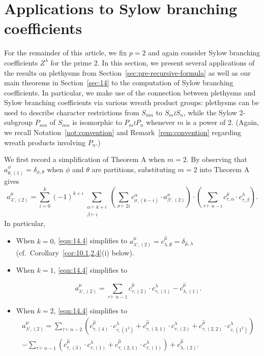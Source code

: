 \documentclass[ALCO, Unicode]{cedram}
\begin{document}
\section{Applications to Sylow branching coefficients}\label{sec:13}
For the remainder of this article, we fix $p=2$ and again consider Sylow branching coefficients $Z^\lambda$ for the prime 2.
In this section, we present several applications of the results on plethysms from Section~\ref{sec:pre-recursive-formula} as well as our main theorems in Section~\ref{sec:14} to the computation of Sylow branching coefficients.
In particular, we make use of the connection between plethysms and Sylow branching coefficients via various wreath product groups: plethysms can be used to describe character restrictions from $S_{mn}$ to $S_m\wr S_n$, while the Sylow 2-subgroup $P_{mn}$ of $S_{mn}$ is isomorphic to $P_m\wr P_n$ whenever $m$ is a power of 2. (Again, we recall Notation~\ref{not:convention} and Remark~\ref{rem:convention} regarding wreath products involving $P_n$.)

We first record a simplification of Theorem A when $m=2$. By observing that $a^\phi_{\theta,(1)}=\delta_{\phi,\theta}$ when $\phi$ and $\theta$ are partitions, substituting $m=2$ into Theorem A gives 
\begin{equation}\label{eqn:14.4}
	a^\mu_{\lambda',(2)} = \sum_{i=0}^k (-1)^{k+i} \sum_{\substack{\alpha\vdash k+i\\\beta\vdash i}} \left(\sum_{\sigma\vdash 2i}c^\alpha_{\sigma,(k-i)}\cdot a^\sigma_{\beta',(2)}\right)\cdot \left(\sum_{\tau\vdash n-i} c^{\hat{\mu}}_{\tau,\alpha}\cdot c^\lambda_{\tau,\beta}\right).
\end{equation}
In particular,
\begin{itemize}
	\item When $k=0$, \eqref{eqn:14.4} simplifies to 
	$a^\mu_{\lambda',(2)} = c^{\hat{\mu}}_{\lambda,\emptyset} = \delta_{\hat{\mu},\lambda}$ (cf.~Corollary~\ref{cor:10.1,2,4}(i) below).
	\item When $k=1$, \eqref{eqn:14.4} simplifies to
	\begin{small}
		\[ a^\mu_{\lambda',(2)} = \sum_{\tau\vdash n-1}c^{\hat{\mu}}_{\tau,(2)}\cdot c^\lambda_{\tau,(1)} - c^{\hat{\mu}}_{\lambda,(1)}. \]
	\end{small}
	\item When $k=2$, \eqref{eqn:14.4} simplifies to
	\begin{multline*}
		a^\mu_{\lambda',(2)} = \sum_{\tau\vdash n-2}\left( c^{\hat{\mu}}_{\tau,(4)}\cdot c^\lambda_{\tau,(1^2)} + c^{\hat{\mu}}_{\tau,(3,1)}\cdot c^\lambda_{\tau,(2)} + c^{\hat{\mu}}_{\tau,(2,2)}\cdot c^\lambda_{\tau,(1^2)} \right)\\
		- \sum_{\tau\vdash n-1}\left( c^{\hat{\mu}}_{\tau,(3)}\cdot c^\lambda_{\tau,(1)} + c^{\hat{\mu}}_{\tau,(2,1)}\cdot c^\lambda_{\tau,(1)} \right) + c^{\hat{\mu}}_{\lambda,(2)}.
	\end{multline*}
\end{itemize}
\end{document}
